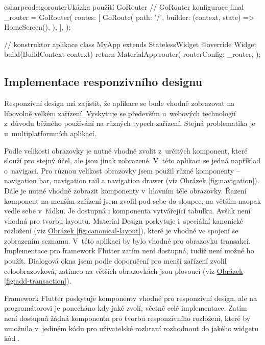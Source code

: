 \documentclass[
  biblatex,
  figures=true,
  tables=false,
  glossaries,
  index
]{kidiplom}
\begin{document}
\begin{kicode}{csharp}{code:gorouter}{Ukázka použití GoRouter}
  // GoRouter konfigurace
  final _router = GoRouter(
    routes: [
      GoRoute(
        path: '/',
        builder: (context, state) => HomeScreen(),
      ),
    ],
  );

  // konstruktor aplikace
  class MyApp extends StatelessWidget {
    @override
    Widget build(BuildContext context) {
      return MaterialApp.router(
        routerConfig: _router,
      );
    }
  }
\end{kicode}

\subsection{Implementace responzivního designu}
Responzivní design má zajistit, že aplikace se bude vhodně zobrazovat na libovolně velkém zařízení. Vyskytuje se především u~webových technologií z~důvodu běžného používání na různých typech zařízení. Stejná problematika je u~multiplatformních aplikací.

Podle velikosti obrazovky je nutné vhodně zvolit z~určitých komponent, které slouží pro stejný účel, ale jsou jinak zobrazené. V~této aplikaci se jedná například o~navigaci. Pro různou velikost obrazovky jsem použil různé komponenty -- navigation bar, navigation rail a navigation drawer (viz \hyperref[fig:navigation]{Obrázek \ref{fig:navigation}}). Dále je nutné vhodně zobrazit komponenty v~hlavním těle obrazovky. Řazení komponent na menším zařízení jsem zvolil pod sebe do sloupce, na větším naopak vedle sebe v~řádku. Je dostupná i komponenta  vytvářející tabulku. Avšak není vhodná pro tvorbu layoutu. Material Design poskytuje i~speciální kanonické rozložení (viz \hyperref[fig:canonical-layout]{Obrázek \ref{fig:canonical-layout}}), které je vhodné ve spojení se zobrazením seznamu. V~této aplikaci by bylo vhodné pro obrazovku transakcí. Implementace pro framework Flutter zatím není dostupná, tudíž není možné ho použít. Dialogová okna jsem podle doporučení pro menší zařízení zvolil celoobrazovková, zatímco na větších obrazovkách jsou plovoucí (viz \hyperref[fig:add-transaction]{Obrázek \ref{fig:add-transaction}}).

Framework Flutter poskytuje komponenty vhodné pro responzivní design, ale na programátorovi je ponecháno kdy jaké zvolí, včetně celé implementace. Zatím není dostupná žádná komponenta pro tvorbu responzivního rozložení, které by umožnila v~jediném kódu pro uživatelské rozhraní rozhodnout do jakého widgetu kód .
\end{document}
